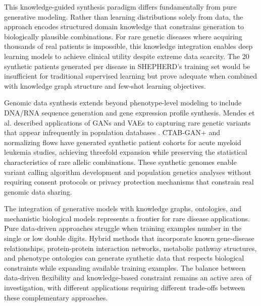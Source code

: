 This knowledge-guided synthesis paradigm differs fundamentally from pure generative modeling. Rather than learning distributions solely from data, the approach encodes structured domain knowledge that constrains generation to biologically plausible combinations. For rare genetic diseases where acquiring thousands of real patients is impossible, this knowledge integration enables deep learning models to achieve clinical utility despite extreme data scarcity. The 20 synthetic patients generated per disease in SHEPHERD's training set would be insufficient for traditional supervised learning but prove adequate when combined with knowledge graph structure and few-shot learning objectives.

Genomic data synthesis extends beyond phenotype-level modeling to include DNA/RNA sequence generation and gene expression profile synthesis. Mendes et al. described applications of GANs and VAEs to capturing rare genetic variants that appear infrequently in population databases \cite{mendes2025synthetic}. CTAB-GAN+ and normalizing flows have generated synthetic patient cohorts for acute myeloid leukemia studies, achieving threefold expansion while preserving the statistical characteristics of rare allelic combinations. These synthetic genomes enable variant calling algorithm development and population genetics analyses without requiring consent protocols or privacy protection mechanisms that constrain real genomic data sharing.

The integration of generative models with knowledge graphs, ontologies, and mechanistic biological models represents a frontier for rare disease applications. Pure data-driven approaches struggle when training examples number in the single or low double digits. Hybrid methods that incorporate known gene-disease relationships, protein-protein interaction networks, metabolic pathway structures, and phenotype ontologies can generate synthetic data that respects biological constraints while expanding available training examples. The balance between data-driven flexibility and knowledge-based constraint remains an active area of investigation, with different applications requiring different trade-offs between these complementary approaches.

